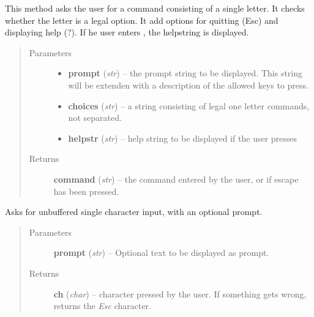 \documentclass[letterpaper,10pt,english]{sphinxmanual}
\begin{document}
\begin{fulllineitems}
\begin{fulllineitems}
This method asks the user for a command consisting of a single letter.
It checks whether the letter is a legal option.
It add options for quitting (Esc) and displaying help (?).
If he user enters , the helpstring is displayed.
\begin{quote}\begin{description}
\item[{Parameters}] \leavevmode\begin{itemize}
\item {} 
\textbf{prompt} (\emph{str}) --
the prompt string to be displayed.
This string will be extenden with a description of the allowed keys to press.

\item {} 
\textbf{choices} (\emph{str}) --
a string consisting of legal  one letter commands, not separated.

\item {} 
\textbf{helpstr} (\emph{str}) --
help string to be displayed if the user presses 

\end{itemize}

\item[{Returns}] \leavevmode
\textbf{command} (\emph{str}) --
the command entered by the user, or  if escape has been pressed.

\end{description}\end{quote}

\end{fulllineitems}


\begin{fulllineitems}
\label{graf/graf:graf.shell.Shell.get_ch}
Asks for unbuffered single character input, with an optional prompt.
\begin{quote}\begin{description}
\item[{Parameters}] \leavevmode
\textbf{prompt} (\emph{str}) --
Optional text to be displayed as prompt.

\item[{Returns}] \leavevmode
\textbf{ch} (\emph{char}) --
character pressed by the user.
If something gets wrong, returns the \emph{Esc} character.

\end{description}\end{quote}


\end{fulllineitems}
\end{fulllineitems}
\end{document}

